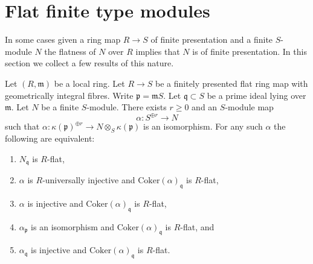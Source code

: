 \section{Flat finite type modules}
\label{section-finite-type-flat}

\noindent
In some cases given a ring map $R \to S$ of finite presentation and
a finite $S$-module $N$ the flatness of $N$ over $R$ implies that $N$
is of finite presentation. In this section we collect a few results
of this nature.

\begin{lemma}
\label{lemma-induction-step}
Let $(R, \mathfrak m)$ be a local ring. Let $R \to S$ be a finitely presented
flat ring map with geometrically integral fibres. Write
$\mathfrak p = \mathfrak mS$. Let $\mathfrak q \subset S$ be a prime ideal
lying over $\mathfrak m$. Let $N$ be a finite $S$-module.
There exists $r \geq 0$ and an $S$-module map
$$
\alpha : S^{\oplus r} \longrightarrow N
$$
such that
$\alpha : \kappa(\mathfrak p)^{\oplus r} \to N \otimes_S \kappa(\mathfrak p)$
is an isomorphism. For any such $\alpha$ the following are equivalent:
\begin{enumerate}
\item $N_{\mathfrak q}$ is $R$-flat,
\item $\alpha$ is $R$-universally injective and
$\text{Coker}(\alpha)_{\mathfrak q}$ is $R$-flat,
\item $\alpha$ is injective and
$\text{Coker}(\alpha)_{\mathfrak q}$ is $R$-flat,
\item $\alpha_{\mathfrak p}$ is an isomorphism and
$\text{Coker}(\alpha)_{\mathfrak q}$ is $R$-flat, and
\item $\alpha_{\mathfrak q}$ is injective and
$\text{Coker}(\alpha)_{\mathfrak q}$ is $R$-flat.
\end{enumerate}
\end{lemma}

